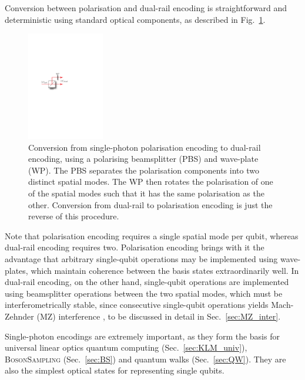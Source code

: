 Conversion between polarisation and dual-rail encoding is straightforward and deterministic using standard optical components, as described in Fig.~\ref{fig:pol_to_dual_conv}.

\begin{figure}[!htbp]
\includegraphics[width=0.3\textwidth]{pol_to_dual_conversion}
\captionspacefig \caption{Conversion from single-photon polarisation encoding to dual-rail encoding, using a polarising beamsplitter (PBS) and wave-plate (WP). The PBS separates the polarisation components into two distinct spatial modes. The WP then rotates the polarisation of one of the spatial modes such that it has the same polarisation as the other. Conversion from dual-rail to polarisation encoding is just the reverse of this procedure.} \label{fig:pol_to_dual_conv}
\end{figure}

Note that polarisation encoding requires a single spatial mode per qubit, whereas dual-rail encoding requires two. Polarisation encoding brings with it the advantage that arbitrary single-qubit operations may be implemented using wave-plates, which maintain coherence between the basis states extraordinarily well. In dual-rail encoding, on the other hand, single-qubit operations are implemented using beamsplitter operations between the two spatial modes, which must be interferometrically stable, since consecutive single-qubit operations yields Mach-Zehnder (MZ) interference \cite{bib:Zehnder1, bib:Zehnder2}, to be discussed in detail in Sec.~\ref{sec:MZ_inter}.

Single-photon encodings are extremely important, as they form the basis for universal linear optics quantum computing (Sec.~\ref{sec:KLM_univ}), \textsc{BosonSampling} (Sec.~\ref{sec:BS}) and quantum walks (Sec.~\ref{sec:QW}). They are also the simplest optical states for representing single qubits.

%
%

